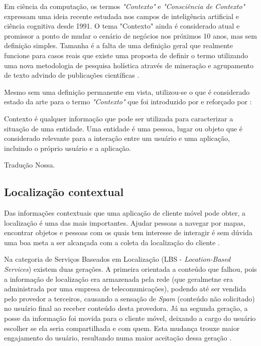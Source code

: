 Em ciência da computação, os termos \emph{"Contexto"} e \emph{"Consciência
de Contexto"} expressam uma ideia recente estudada nos campos de inteligência
artificial e ciência cognitiva desde 1991. O tema "Contexto" ainda é considerado
atual e promissor a ponto de mudar o cenário de negócios nos próximos 10 anos, mas
sem definição simples. Tamanha é a falta de uma definição geral que
realmente funcione para casos reais que existe uma proposta de definir o termo
utilizando uma nova metodologia de pesquisa holística através de mineração e
agrupamento de texto advindo de publicações científicas \cite{Pascalau2013}.

Mesmo sem uma definição permanente em vista, utilizou-se o que é considerado
estado da arte para o termo \emph{"Contexto"} que foi introduzido por
 e reforçado por :

\begin{citacao}

	Contexto é qualquer informação que pode ser utilizada para caracterizar a
	situação de uma entidade. Uma entidade é uma pessoa, lugar ou objeto que é
	considerado relevante para a interação entre um usuário e uma aplicação,
	incluindo o próprio usuário e a aplicação. \

	 Tradução Nossa.
\end{citacao}

\subsection{Localização contextual}
\label{subsec:Localização contextual}

Das informações contextuais que uma aplicação de cliente móvel pode obter, a
localização é uma das mais importantes. Ajudar pessoas a navegar por mapas,
encontrar objetos e pessoas com os quais tem interesse de interagir é sem dúvida
uma boa meta a ser alcançada com a coleta da localização do cliente
\cite{Bellavista2008}.

Na categoria de Serviços Baseados em Localização (LBS - \emph{Location-Based
Services}) existem duas gerações. A primeira orientada a conteúdo que falhou,
pois a informação de localização era armazenada pela rede (que geralmetne era
administrada por uma empresa de telecomunicações), podendo até ser vendida pelo
provedor a terceiros, causando a sensação de \emph{Spam} (conteúdo não
solicitado) no usuário final ao receber conteúdo desta provedora. Já na segunda
geração, a posse da informação foi movida para o cliente móvel, deixando a cargo
do usuário escolher se ela seria compartilhada e com quem. Esta mudança trouxe
maior engajamento do usuário, resultando numa maior aceitação dessa geração
\cite{Bellavista2008}.


